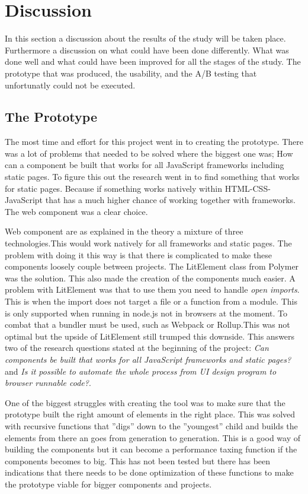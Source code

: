 \section{Discussion}

In this section a discussion about the results of the study will be taken place. Furthermore a discussion on what could have been done differently. What was done well and what could have been improved for all the stages of the study. The prototype that was produced, the usability, and the A/B testing that unfortunatly could not be executed.


\subsection{The Prototype}%
\label{sub:The Prototype}
The most time and effort for this project went in to creating the prototype. 
There was a lot of problems that needed to be solved where the biggest one was; How can a component be built that works for all JavaScript frameworks including static pages. To figure this out the research went in to find something that works for static pages. Because if something works natively within HTML-CSS-JavaScript that has a much higher chance of working together with frameworks. The web component was a clear choice.

Web component are as explained in the theory a mixture of three technologies.This would work natively for all frameworks and static pages. The problem with doing it this way is that there is complicated to make these components loosely couple between projects. The LitElement class from Polymer was the solution. This also made the creation of the components much easier. A problem with LitElement was that to use them you need to handle \textit{open imports}. This is when the import does not target a file or a function from a module. This is only supported when running in node.js not in browsers at the moment. To combat that a bundler must be used, such as Webpack or Rollup.This was not optimal but the upside of LitElement still trumped this downside. This answers two of the research questions stated at the beginning of the project: \textit{Can components be built that works for all JavaScript frameworks and static pages?} and \textit{Is it possible to automate the whole process from UI design program to browser runnable code?}.


One of the biggest struggles with creating the tool was to make sure that the prototype built the right amount of elements in the right place. This was solved with recursive functions that ''digs'' down to the ''youngest'' child and builds the elements from there an goes from generation to generation. This is a good way of building the components but it can become a performance taxing function if the components becomes to big. This has not been tested but there has been indications that there needs to be done optimization of these functions to make the prototype viable for bigger components and projects.


